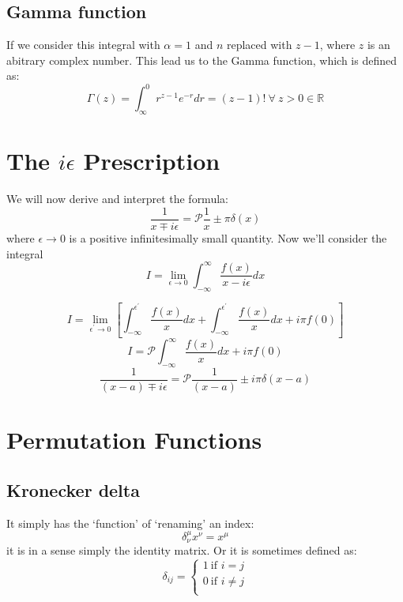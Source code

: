 \subsection{Gamma function}
If we consider this integral with $\alpha = 1$ and $n$ replaced with $z-1$, where $z$ is an abitrary complex number. This lead us to the Gamma function, which is defined as:
\begin{equation}
\Gamma (z) = \int^{0}_{\infty} r^{z-1} e^{-r} dr = (z-1)! \ \forall \ z > 0 \in \mathbb{R}
\end{equation}
\section{The $i \epsilon$ Prescription}
We will now derive and interpret the formula:
\begin{equation}
\frac{1}{x \mp i \epsilon} = \mathscr{P} \frac{1}{x} \pm \pi \delta (x)
\end{equation}
where $\epsilon \rightarrow 0$ is a positive infinitesimally small quantity. Now we'll consider the integral
\begin{equation}
	I = \lim_{\epsilon \rightarrow 0} \int_{- \infty}^{\infty} \frac{f(x)}{x - i \epsilon} dx
\end{equation}

$$	I = \lim_{\epsilon^{'} \rightarrow 0} \left[ \int_{- \infty}^{\epsilon^{'}} \frac{f(x)}{x} dx + \int_{- \infty}^{\epsilon^{'}} \frac{f(x)}{x} dx + i \pi f(0)\right]$$
\begin{equation}
I =   \mathscr{P}\int_{- \infty}^{\infty} \frac{f(x)}{x} dx + i \pi f(0)
\end{equation}
\begin{equation}
\frac{1}{(x-a)\mp i \epsilon} = \mathscr{P}\frac{1}{(x-a)}\pm i \pi \delta(x-a)
\end{equation}
\section{Permutation Functions}
\subsection{Kronecker delta}
It simply has the ‘function’ of ‘renaming’ an index:
$$\delta^{\mu}_{\nu} x^{\nu} = x^{\mu}$$
it is in a sense simply the identity matrix. Or it is sometimes defined as:
\begin{equation}
\delta_{ij} = \begin{cases}
1 \ \text{if } i = j \\
0 \ \text{if } i \neq j\\
\end{cases}
\end{equation}
